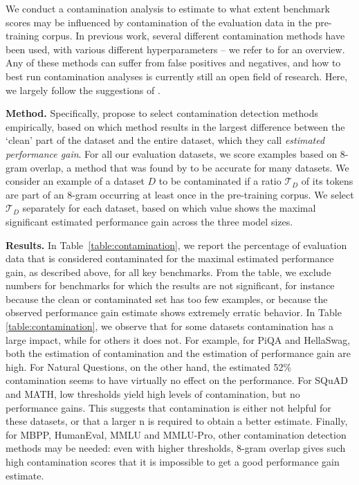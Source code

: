 We conduct a contamination analysis to estimate to what extent benchmark scores may be influenced by contamination of the evaluation data in the pre-training corpus. In previous work, several different contamination methods have been used, with various different hyperparameters -- we refer to \citet{singh2024contamination} for an overview. Any of these methods can suffer from false positives and negatives, and how to best run contamination analyses is currently still an open field of research. Here, we largely follow the suggestions of \citet{singh2024contamination}.

\textbf{Method.}
Specifically, \citet{singh2024contamination} propose to select contamination detection methods empirically, based on which method results in the largest difference between the `clean' part of the dataset and the entire dataset, which they call \emph{estimated performance gain}. For all our evaluation datasets, we score examples based on 8-gram overlap, a method that was found by \citet{singh2024contamination} to be accurate for many datasets. We consider an example of a dataset $D$ to be contaminated if a ratio $\mathcal{T}_D$ of its tokens are part of an 8-gram occurring at least once in the pre-training corpus. We select $\mathcal{T}_D$ separately for each dataset, based on which value shows the maximal significant estimated performance gain across the three model sizes.

\textbf{Results.}
In Table~\ref{table:contamination}, we report the percentage of evaluation data that is considered contaminated for the maximal estimated performance gain, as described above, for all key benchmarks. From the table, we exclude numbers for benchmarks for which the results are not significant, for instance because the clean or contaminated set has too few examples, or because the observed performance gain estimate shows extremely erratic behavior. In Table \ref{table:contamination}, we observe that for some datasets contamination has a large impact, while for others it does not. For example, for PiQA and HellaSwag, both the estimation of contamination and the estimation of performance gain are high. For Natural Questions, on the other hand, the estimated 52\% contamination seems to have virtually no effect on the performance. For SQuAD and MATH, low thresholds yield high levels of contamination, but no performance gains. This suggests that contamination is either not helpful for these datasets, or that a larger n is required to obtain a better estimate. Finally, for MBPP, HumanEval, MMLU and MMLU-Pro, other contamination detection methods may be needed: even with higher thresholds, 8-gram overlap gives such high contamination scores that it is impossible to get a good performance gain estimate.

